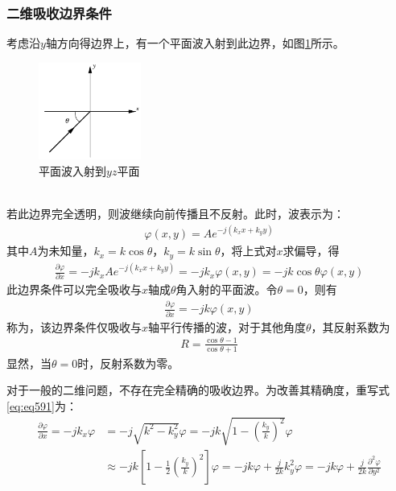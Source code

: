 \documentclass{article}
\numberwithin{equation}{section}
\begin{document}
\subsubsection{二维吸收边界条件}
考虑沿$y$轴方向得边界上，有一个平面波入射到此边界，如图\ref{fig:fig51}所示。
\begin{figure}[ht]
    \centering
    \includegraphics[width=0.3\textwidth]{平面波入射到yz平面.PNG}
    \caption{平面波入射到$yz$平面}
    \label{fig:fig51}
\end{figure}
\\
若此边界完全透明，则波继续向前传播且不反射。此时，波表示为：
\begin{align}
    \label{eq:eq590}
    \varphi(x,y)=Ae^{-j(k_xx+k_yy)}
\end{align}
其中$A$为未知量，$k_x=k\cos\theta$，$k_y=k\sin\theta$，将上式对$x$求偏导，得
\begin{align}
    \label{eq:eq591}
    \frac{\partial \varphi}{\partial x}=-jk_xAe^{-j(k_xx+k_yy)}=-jk_x\varphi(x,y)=-jk\cos\theta\varphi(x,y)
\end{align}
此边界条件可以完全吸收与$x$轴成$\theta$角入射的平面波。令$\theta=0$，则有
\begin{align}
    \label{eq:eq592}
    \frac{\partial \varphi}{\partial x}=-jk\varphi(x,y)
\end{align}
称为\textbf{\color{blue}{一阶吸收边界条件}}，该边界条件仅吸收与$x$轴平行传播的波，对于其他角度$\theta$，其反射系数为
\begin{align}
    \label{eq:eq593}
    R=\frac{\cos\theta-1}{\cos\theta+1}
\end{align}
显然，当$\theta=0$时，反射系数为零。\par
对于一般的二维问题，不存在完全精确的吸收边界。为改善其精确度，重写式\ref{eq:eq591}为：
\begin{align}
    \label{eq:eq594}
    \frac{\partial \varphi}{\partial x}=-jk_x\varphi&=-j\sqrt{k^2-k_y^2}\varphi=-jk\sqrt{1-\left(\frac{k_y}{k}\right)^2}\varphi \nonumber \\
    &\approx-jk\left[1-\frac{1}{2}\left(\frac{k_y}{k}\right)^2\right]\varphi=-jk\varphi+\frac{j}{2k}k_y^2\varphi=-jk\varphi+\frac{j}{2k}\frac{\partial^2\varphi}{\partial y^2}
\end{align}
\end{document}
